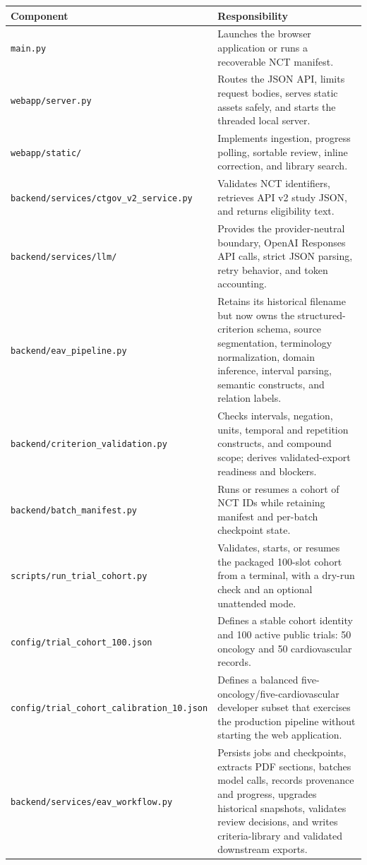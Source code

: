 \documentclass[11pt]{article}
\newcommand{\code}[1]{\nolinkurl{#1}}
\begin{document}
\begin{longtable}{p{}p{}}
\toprule
Component & Responsibility \\
\midrule
\endhead
\code{main.py} & Launches the browser application or runs a recoverable NCT manifest. \\
\code{webapp/server.py} & Routes the JSON API, limits request bodies, serves static assets safely, and starts the threaded local server. \\
\code{webapp/static/} & Implements ingestion, progress polling, sortable review, inline correction, and library search. \\
\code{backend/services/ctgov_v2_service.py} & Validates NCT identifiers, retrieves API v2 study JSON, and returns eligibility text. \\
\code{backend/services/llm/} & Provides the provider-neutral boundary, OpenAI Responses API calls, strict JSON parsing, retry behavior, and token accounting. \\
\code{backend/eav_pipeline.py} & Retains its historical filename but now owns the structured-criterion schema, source segmentation, terminology normalization, domain inference, interval parsing, semantic constructs, and relation labels. \\
\code{backend/criterion_validation.py} & Checks intervals, negation, units, temporal and repetition constructs, and compound scope; derives validated-export readiness and blockers. \\
\code{backend/batch_manifest.py} & Runs or resumes a cohort of NCT IDs while retaining manifest and per-batch checkpoint state. \\
\code{scripts/run_trial_cohort.py} & Validates, starts, or resumes the packaged 100-slot cohort from a terminal, with a dry-run check and an optional unattended mode. \\
\code{config/trial_cohort_100.json} & Defines a stable cohort identity and 100 active public trials: 50 oncology and 50 cardiovascular records. \\
\code{config/trial_cohort_calibration_10.json} & Defines a balanced five-oncology/five-cardiovascular developer subset that exercises the production pipeline without starting the web application. \\
\code{backend/services/eav_workflow.py} & Persists jobs and checkpoints, extracts PDF sections, batches model calls, records provenance and progress, upgrades historical snapshots, validates review decisions, and writes criteria-library and validated downstream exports. \\

\end{longtable}
\end{document}
